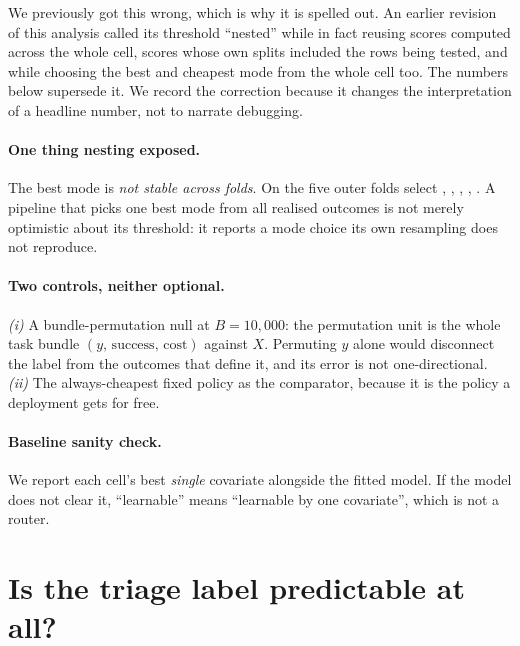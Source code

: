 We previously got this wrong, which is why it is spelled out. An earlier
revision of this analysis called its threshold ``nested'' while in fact
reusing scores computed across the whole cell, scores whose own splits
included the rows being tested, and while choosing the best and cheapest
mode from the whole cell too. The numbers below supersede it.
We record the correction because it changes the interpretation of a headline
number, not to narrate debugging.

\paragraph{One thing nesting exposed.} The best mode is \emph{not stable across
folds}. On  the five outer folds select \mDOM{}, \mDOM{},
\mSoM{}, \mSoM{}, \mDOM{}. A pipeline that picks one best mode from all realised
outcomes is not merely optimistic about its threshold: it reports a mode choice its own resampling does not reproduce.

\paragraph{Two controls, neither optional.} \emph{(i)} A bundle-permutation
null at $B=10{,}000$: the permutation unit is the whole task bundle
$(y,\,\mathrm{success},\,\mathrm{cost})$ against $X$. Permuting $y$ alone would
disconnect the label from the outcomes that define it, and its error is not
one-directional. \emph{(ii)} The always-cheapest fixed policy as the comparator,
because it is the policy a deployment gets for free.

\paragraph{Baseline sanity check.} We report each cell's best \emph{single}
covariate alongside the fitted model. If the model does not clear it, ``learnable''
means ``learnable by one covariate'', which is not a router.

\FloatBarrier
\section{Is the triage label predictable at all?}
\label{sec:auroc}

